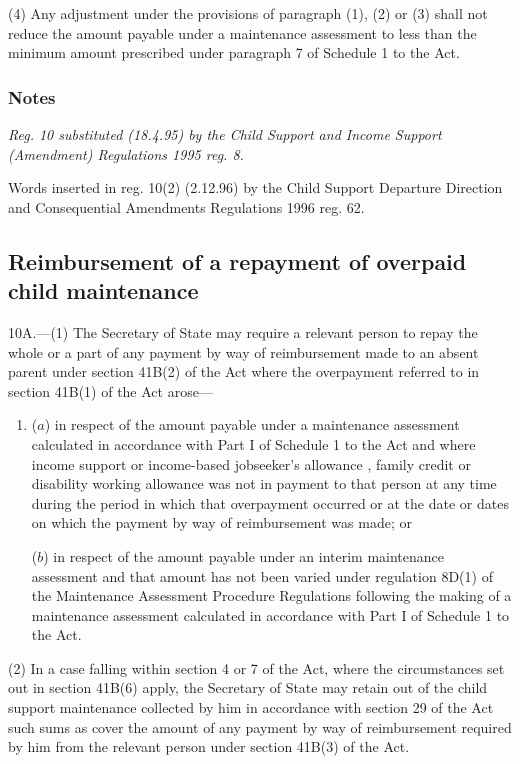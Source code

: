 \documentclass[a4paper]{article}
\newcommand\amendment[1]{\subsubsection*{Notes}{\itshape\frenchspacing\footnotesize #1 \par}}
\begin{document}
(4) Any adjustment under the provisions of paragraph (1), (2) or (3) shall not reduce the amount payable under a maintenance assessment to less than the minimum amount prescribed under paragraph 7 of Schedule 1 to the Act.

\amendment{
Reg. 10 substituted (18.4.95) by the Child Support and Income Support (Amendment) Regulations 1995 reg. 8.

Words inserted in reg. 10(2) (2.12.96) by the Child Support Departure Direction and Consequential Amendments Regulations 1996 reg. 62.
}


\subsection[10A. Reimbursement of a repayment of overpaid child maintenance]{Reimbursement of a repayment of overpaid child maintenance}

10A.—(1) The Secretary of State may require a relevant person to repay the whole or a part of any payment by way of reimbursement made to an absent parent under section 41B(2) of the Act where the overpayment referred to in section 41B(1) of the Act arose—
\begin{enumerate}\item[]
($a$) in respect of the amount payable under a maintenance assessment calculated in accordance with Part I of Schedule 1 to the Act and where income support
or income-based jobseeker’s allowance%
, family credit or disability working allowance was not in payment to that person at any time during the period in which that overpayment occurred or at the date or dates on which the payment by way of reimbursement was made; or

($b$) in respect of the amount payable under an interim maintenance assessment and that amount has not been varied under regulation 8D(1) of the Maintenance Assessment Procedure Regulations following the making of a maintenance assessment calculated in accordance with Part I of Schedule 1 to the Act.
\end{enumerate}

(2) In a case falling within section 4 or 7 of the Act, where the circumstances set out in section 41B(6) apply, the Secretary of State may retain out of the child support maintenance collected by him in accordance with section 29 of the Act such sums as cover the amount of any payment by way of reimbursement required by him from the relevant person under section 41B(3) of the Act.
\end{document}
